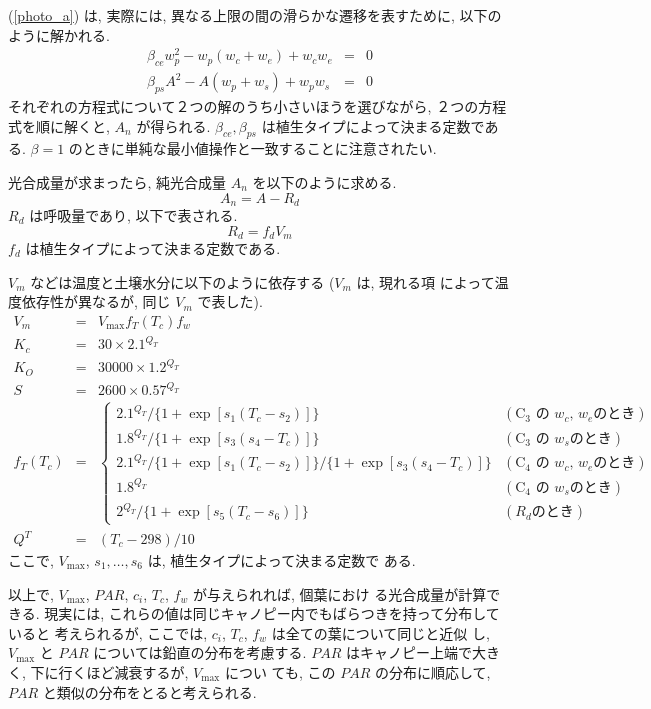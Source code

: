 (\ref{photo_a}) は, 実際には, 異なる上限の間の滑らかな遷移を表すために,
以下のように解かれる. 
\begin{eqnarray}
 \beta_{ce} w_p^2 - w_p(w_c + w_e) + w_c w_e &=& 0 \\
 \beta_{ps} A^2 - A(w_p + w_s) + w_p w_s &=& 0
\end{eqnarray}
それぞれの方程式について２つの解のうち小さいほうを選びながら, ２つの方程
式を順に解くと, $A_n$ が得られる. 
$\beta_{ce}, \beta_{ps}$ は植生タイプによって決まる定数である. $\beta=1$
のときに単純な最小値操作と一致することに注意されたい. 

光合成量が求まったら, 純光合成量 $A_n$ を以下のように求める. 
\begin{equation}
 A_n = A - R_d
\end{equation}
$R_d$ は呼吸量であり, 以下で表される. 
\begin{equation}
 R_d = f_d V_m
\end{equation}
$f_d$ は植生タイプによって決まる定数である. 

$V_m$ などは温度と土壌水分に以下のように依存する ($V_m$ は, 現れる項
によって温度依存性が異なるが, 同じ $V_m$ で表した). 
\begin{eqnarray}
 V_m &=& V_{\max} f_T(T_c) f_w \\
 K_c &=& 30 \times 2.1^{Q_T} \\
 K_O &=& 30000 \times 1.2^{Q_T} \\
 S   &=& 2600 \times 0.57^{Q_T} \\
 f_T(T_c) &=& \left\{
\begin{array}{ll}
 2.1^{Q_T}/\{1 + \exp[s_1(T_c-s_2)]\}&  (\mbox{C$_3$ の $w_c$, $w_e$のとき})\\
 1.8^{Q_T}/\{1 + \exp[s_3(s_4-T_c)]\}&  (\mbox{C$_3$ の $w_s$のとき}) \\
 2.1^{Q_T}/\{1 + \exp[s_1(T_c-s_2)]\}/\{1 + \exp[s_3(s_4-T_c)]\}
  &  (\mbox{C$_4$ の $w_c$, $w_e$のとき})\\
 1.8^{Q_T} &  (\mbox{C$_4$ の $w_s$のとき}) \\
 2^{Q_T}/\{1 + \exp[s_5(T_c-s_6)]\} &  (\mbox{$R_d$のとき})
\end{array}
\right. \\
Q^T &=& (T_c - 298) / 10
\end{eqnarray}
ここで, $V_{\max}$, $s_1, \ldots, s_6$ は, 植生タイプによって決まる定数で
ある. 

以上で, $V_{\max}$, $PAR$, $c_i$, $T_c$, $f_w$ が与えられれば, 個葉におけ
る光合成量が計算できる. 
現実には, これらの値は同じキャノピー内でもばらつきを持って分布していると
考えられるが, ここでは, $c_i$, $T_c$, $f_w$ は全ての葉について同じと近似
し, $V_{\max}$ と $PAR$ については鉛直の分布を考慮する. 
$PAR$ はキャノピー上端で大きく, 下に行くほど減衰するが, $V_{\max}$ につい
ても, この $PAR$ の分布に順応して, $PAR$ と類似の分布をとると考えられる. 

